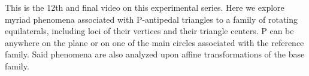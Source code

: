This is the 12th and final video on this experimental series. Here we explore myriad phenomena associated with P-antipedal triangles to a family of rotating equilaterals, including loci of their vertices and their triangle centers. P can be anywhere on the plane or on one of the main circles associated with the reference family. Said phenomena are also analyzed upon affine transformations of the base family.